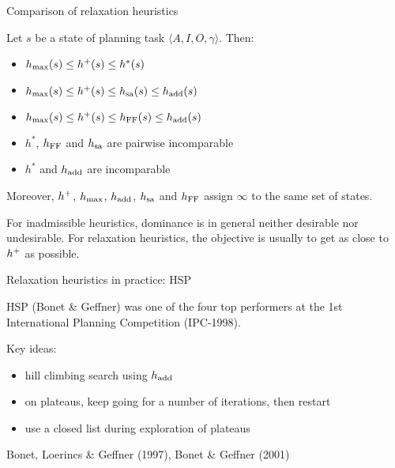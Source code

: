 \documentclass{gkibeamer}
\begin{document}
\begin{frame}{Comparison of relaxation heuristics}
  \begin{theorem}
    Let $s$ be a state of planning task $\langle A, I, O, \gamma\rangle$.
    Then:
    \begin{itemize}
    \item $h_{\text{max}}(s) \le h^+(s) \le h^*(s)$
    \item $h_{\text{max}}(s) \le h^+(s) \le h_{\text{sa}}(s) \le h_{\text{add}}(s)$
    \item $h_{\text{max}}(s) \le h^+(s) \le h_{\text{FF}}(s) \le h_{\text{add}}(s)$
    \item $h^*$, $h_{\text{FF}}$ and $h_{\text{sa}}$ are pairwise incomparable
    \item $h^*$ and $h_{\text{add}}$ are incomparable
    \end{itemize}
    Moreover, $h^+$, $h_{\text{max}}$, $h_{\text{add}}$, $h_{\text{sa}}$ and $h_{\text{FF}}$ assign
    $\infty$ to the same set of states.
  \end{theorem}
   For \alert{inadmissible} heuristics, dominance is in
  general neither desirable nor undesirable. For relaxation
  heuristics, the objective is usually to get as close to $h^+$ as
  possible.
\end{frame}

\begin{frame}{Relaxation heuristics in practice: HSP}
  \begin{example}[HSP]
    \alert{HSP} (Bonet \& Geffner) was one of the four top performers
    at the 1st International Planning Competition (IPC-1998).
    
    \smallskip

    Key ideas:
    \begin{itemize}
    \item \alert{hill climbing} search using \alert{$h_{\text{add}}$}
    \item on \alert{plateaus}, keep going for a number of iterations,
      then restart
    \item use a closed list during exploration of plateaus
    \end{itemize}
  \end{example}
   Bonet, Loerincs \& Geffner (1997),
  Bonet \& Geffner (2001)
\end{frame}
\end{document}
